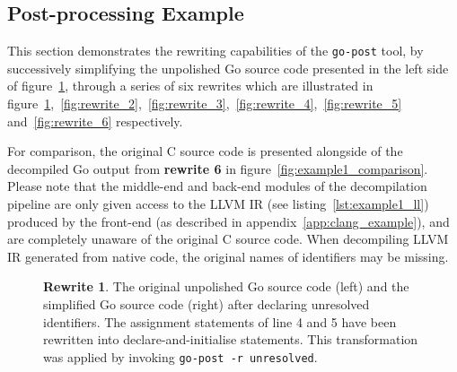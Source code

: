 
\subsection{Post-processing Example}
\label{app:post-processing_example}

This section demonstrates the rewriting capabilities of the \texttt{go-post} tool, by successively simplifying the unpolished Go source code presented in the left side of figure~\ref{fig:rewrite_1}, through a series of six rewrites which are illustrated in figure~\ref{fig:rewrite_1},~\ref{fig:rewrite_2},~\ref{fig:rewrite_3},~\ref{fig:rewrite_4},~\ref{fig:rewrite_5} and~\ref{fig:rewrite_6} respectively.

For comparison, the original C source code is presented alongside of the decompiled Go output from \textbf{rewrite 6} in figure~\ref{fig:example1_comparison}. Please note that the middle-end and back-end modules of the decompilation pipeline are only given access to the LLVM IR (see listing~\ref{lst:example1_ll}) produced by the front-end (as described in appendix~\ref{app:clang_example}), and are completely unaware of the original C source code. When decompiling LLVM IR generated from native code, the original names of identifiers may be missing.

\begin{figure}[htbp]
	\centering
	\begin{subfigure}[t]{0.45\textwidth}
		
	\end{subfigure}
	\qquad
	\begin{subfigure}[t]{0.45\textwidth}
		
	\end{subfigure}
	\caption{\textbf{Rewrite 1}. The original unpolished Go source code (left) and the simplified Go source code (right) after declaring unresolved identifiers. The assignment statements of line 4 and 5 have been rewritten into declare-and-initialise statements. This transformation was applied by invoking \texttt{go-post -r unresolved}.}
	\label{fig:rewrite_1}
\end{figure}

